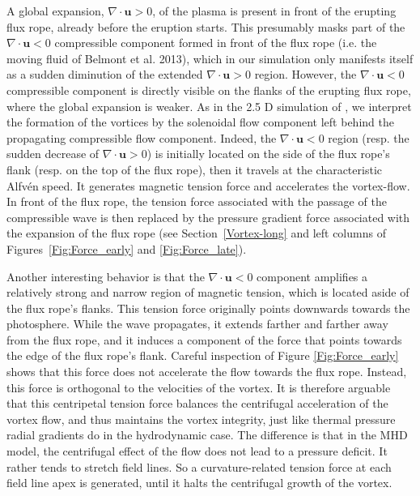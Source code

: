 \documentclass[apj]{emulateapj}
\begin{document}
A global expansion, $\nabla \cdot \mathbf{u}>0$, of the plasma is present in front of the erupting flux rope, already before the eruption starts. This presumably masks part of the  $\nabla \cdot \mathbf{u} <0$  compressible component formed in front of the flux rope (i.e. the moving fluid of Belmont et al. 2013), which in our simulation only manifests itself as a sudden diminution of the extended $\nabla \cdot \mathbf{u}>0$ region. However, the  $\nabla \cdot \mathbf{u} <0$ compressible component is directly visible on the flanks of the erupting flux rope, where the global expansion is weaker.  As in the 2.5 D simulation of \cite{Belmont2013}, we interpret the formation of the vortices by the solenoidal flow component left behind the propagating compressible flow component.
Indeed, the $\nabla \cdot \mathbf{u}<0$ region (resp. the sudden decrease of $\nabla \cdot \mathbf{u}>0$) is initially located on the side of the flux rope's flank (resp. on the top of the flux rope), then it travels at the characteristic Alfv\'{e}n speed. It generates magnetic tension force and accelerates the vortex-flow. In front of the flux rope, the tension force associated with the passage of the compressible wave is then replaced by the pressure gradient force associated with the expansion of the flux rope (see Section~\ref{Vortex-long} and left columns of Figures~\ref{Fig:Force_early} and \ref{Fig:Force_late}).

Another interesting behavior is that the $\nabla \cdot \mathbf{u} <0$ component amplifies a relatively strong and narrow region of magnetic tension, which is located aside of the flux rope's flanks. This tension force originally points downwards towards the photosphere. While the wave propagates, it extends farther and farther away from the flux rope, and it induces a component of the force that points towards the edge of the flux rope's flank. Careful inspection of Figure \ref{Fig:Force_early} shows that this force does not accelerate the flow towards the flux rope. Instead, this force is orthogonal to the velocities of the vortex. It is therefore arguable that this centripetal tension force balances the centrifugal acceleration of the vortex flow, and thus maintains the vortex integrity, just like thermal pressure radial gradients do in the hydrodynamic case. The difference is that in the MHD model, the centrifugal effect of the flow does not lead to a pressure deficit. It rather tends to stretch field lines. So a curvature-related tension force at each field line apex is generated, until it halts the centrifugal growth of the vortex. 
\end{document}

